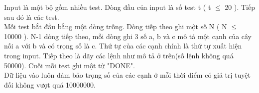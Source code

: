 Input là một bộ gồm nhiều test. Dòng đầu của input là số test t ( t $\le$ 20 ). Tiếp sau đó là các test.   
\\   Mỗi test bắt đầu bằng một dòng trống. Dòng tiếp theo ghi một số N ( N $\le$ 10000 ). N-1 dòng tiếp theo, mỗi dòng ghi 3 số a, b và c mô tả một cạnh của cây nối a với b và có trọng số là c. Thứ tự của các cạnh chính là thứ tự xuất hiện trong input. Tiếp theo là dãy các lệnh như mô tả ở trên(số lệnh không quá 50000). Cuối mỗi test ghi một từ "DONE".   
\\   Dữ liệu vào luôn đảm bảo trọng số của các cạnh ở mỗi thời điểm có giá trị tuyệt đối không vượt quá 10000000.  

\
